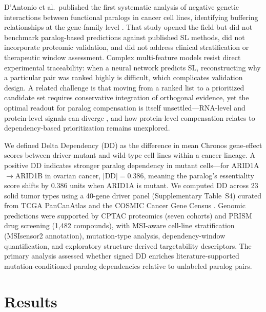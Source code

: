 \documentclass[11pt,a4paper]{article}
\begin{document}
D'Antonio et al.\ published the first systematic analysis of negative genetic interactions between functional paralogs in cancer cell lines, identifying buffering relationships at the gene-family level \cite{DAntonio2013}. That study opened the field but did not benchmark paralog-based predictions against published SL methods, did not incorporate proteomic validation, and did not address clinical stratification or therapeutic window assessment. Complex multi-feature models resist direct experimental traceability: when a neural network predicts SL, reconstructing why a particular pair was ranked highly is difficult, which complicates validation design. A related challenge is that moving from a ranked list to a prioritized candidate set requires conservative integration of orthogonal evidence, yet the optimal readout for paralog compensation is itself unsettled—RNA-level and protein-level signals can diverge \cite{Venkatesh2025}, and how protein-level compensation relates to dependency-based prioritization remains unexplored.

We defined Delta Dependency (DD) as the difference in mean Chronos gene-effect scores between driver-mutant and wild-type cell lines within a cancer lineage. A positive DD indicates stronger paralog dependency in mutant cells—for ARID1A$\rightarrow$ARID1B in ovarian cancer, $|$DD$| = 0.386$, meaning the paralog's essentiality score shifts by 0.386 units when ARID1A is mutant. We computed DD across 23 solid tumor types using a 40-gene driver panel (Supplementary Table~S4) curated from TCGA PanCanAtlas \cite{Bailey2018} and the COSMIC Cancer Gene Census \cite{Sondka2018}. Genomic predictions were supported by CPTAC proteomics (seven cohorts) and PRISM drug screening (1,482 compounds), with MSI-aware cell-line stratification (MSIsensor2 annotation), mutation-type analysis, dependency-window quantification, and exploratory structure-derived targetability descriptors. The primary analysis assessed whether signed DD enriches literature-supported mutation-conditioned paralog dependencies relative to unlabeled paralog pairs.


\section*{Results}

\end{document}
